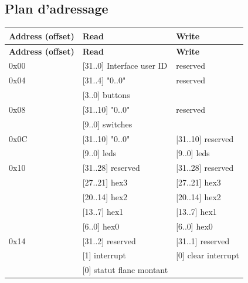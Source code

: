 \documentclass[a4paper,12pt]{article}
\begin{document}
\subsection{Plan d'adressage}

\begin{longtable}{|p{4cm}|p{5cm}|p{6cm}|}
    \hline
    \textbf{Address (offset)} & \textbf{Read}             & \textbf{Write}         \\
    \hline
    \endfirsthead
    \hline
    \textbf{Address (offset)} & \textbf{Read}             & \textbf{Write}         \\
    \hline
    \endhead
    \hline
    \endfoot
    \hline
    \endlastfoot

    0x00                      & [31..0] Interface user ID & reserved               \\
    \hline
    0x04                      & [31..4] "0..0"            & reserved               \\
                              & [3..0] buttons            &                        \\
    \hline
    0x08                      & [31..10] "0..0"           & reserved               \\
                              & [9..0] switches           &                        \\
    \hline
    0x0C                      & [31..10] "0..0"           & [31..10] reserved      \\
                              & [9..0] leds               & [9..0] leds            \\
    \hline
    0x10                      & [31..28] reserved         & [31..28] reserved      \\
                              & [27..21] hex3             & [27..21] hex3          \\
                              & [20..14] hex2             & [20..14] hex2          \\
                              & [13..7] hex1              & [13..7] hex1           \\
                              & [6..0] hex0               & [6..0] hex0            \\
    \hline
    0x14                      & [31..2] reserved          & [31..1] reserved       \\
                              & [1] interrupt             & [0] clear interrupt    \\
                              & [0] statut flanc montant  &                        \\

\end{longtable}
\end{document}
